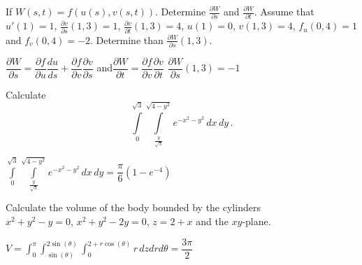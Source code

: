 \begin{Exercise} If $W(s,t) = f(u(s), v(s,t))$. 
\Question  Determine $\frac{\partial W}{\partial s}$ and $\frac{\partial W}{\partial t}$.	
\Question Assume that $u'(1) = 1$, $\frac{\partial v}{\partial s}(1,3) = 1$, $\frac{\partial v}{\partial t}(1,3) = 4$, $u(1)=0$, $v(1,3)=4$, $f_u(0,4)=1$ and $f_v(0,4)=-2$. Determine than $\frac{\partial W}{\partial s}(1,3)$.
\end{Exercise}

\begin{Answer}
\Question $\dfrac{\partial W}{\partial s} = \dfrac{\partial f}{\partial u}\dfrac{du}{ds} + \dfrac{\partial f}{\partial v}\dfrac{\partial v}{\partial s}$ \qquad and\qquad $\dfrac{\partial W}{\partial t} = \dfrac{\partial f}{\partial v}\dfrac{\partial v}{\partial t}$
\Question $\dfrac{\partial W}{\partial s}(1,3)=-1$    
\end{Answer}


\begin{Exercise} Calculate
\[
\int\limits_0^{\sqrt{3}}\int\limits_{\frac{y}{\sqrt{3}}}^{\sqrt{4-y^2}}e^{-x^2-y^2}\,dx\,dy\,.
\]
\end{Exercise}

\begin{Answer}
 $\int\limits_0^{\sqrt{3}}\int\limits_{\frac{y}{\sqrt{3}}}^{\sqrt{4-y^2}}e^{-x^2-y^2}\,dx\,dy = \dfrac{\pi}{6}\left(1-e^{-4}\right)$   
\end{Answer}


\begin{Exercise} Calculate the volume of the body bounded by the cylinders \\ $x^2 + y^2 -y = 0$, $x^2 + y^2 -2y = 0$, $z=2+x$ and the $xy$-plane. 
\end{Exercise}

\begin{Answer}
$\displaystyle V=\int_0^{\pi}\int_{\sin(\theta)}^{2\sin(\theta)}\int_0^{2+r\cos(\theta)} r\, dz dr d\theta = \dfrac{3\pi}{2}$    
\end{Answer}


